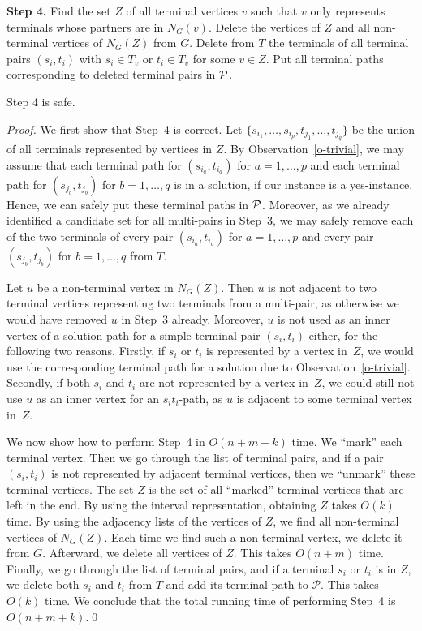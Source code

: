 \documentclass{llncs}
\newcommand{\mc}{\mathcal}
\begin{document}
\medskip
\noindent
{\bf Step 4.}
Find the set $Z$ of all terminal vertices $v$ such that $v$ only represents terminals  whose partners are in $N_G(v)$.
Delete the vertices of $Z$ and all non-terminal vertices of $N_G(Z)$ from $G$. Delete from $T$ the terminals of all terminal pairs $(s_i,t_i)$ with $s_i\in T_v$ or $t_i\in T_v$ for some $v\in Z$. Put all terminal paths corresponding to deleted terminal pairs in ${\cal P}$.

\begin{lemma}\label{l-4}
Step 4 is safe.
\end{lemma}

\begin{proof}
We first show that Step~4 is correct. Let $\{s_{i_1},\ldots,s_{i_p},t_{j_1},\ldots,t_{j_q}\}$ be the union of all terminals represented by
vertices in  $Z$. 
By Observation~\ref{o-trivial}, we may assume that each terminal path for $(s_{i_a},t_{i_a})$ for $a=1,\ldots,p$ and each terminal path for 
$(s_{j_b},t_{j_b})$ for $b = 1,\ldots,q$ is 
in a solution, if our instance is a yes-instance. Hence, we can safely put these terminal paths in ${\cal P}$. Moreover, as we already identified a candidate set for all multi-pairs  in Step~3, we may safely remove each of the two terminals of every pair $(s_{i_a},t_{i_a})$ for $a=1,\ldots,p$ and every pair $(s_{j_b},t_{j_b})$ for $b=1,\ldots,q$
from $T$.

Let $u$ be a non-terminal vertex in $N_G(Z)$. 
Then $u$ is not adjacent to two terminal vertices representing two terminals from a multi-pair, as otherwise we would
have removed $u$ in Step~3 already. Moreover, $u$ is not used as an inner vertex of a solution path for a simple terminal pair $(s_i,t_i)$ either, for the following two reasons.
Firstly, if $s_i$ or $t_i$ is represented by a vertex in~$Z$, we would use the corresponding terminal path for a solution due to
Observation~\ref{o-trivial}. Secondly, if both $s_i$ and $t_i$ are not represented by a vertex in~$Z$,  we could still not use
$u$ as an inner vertex for an $s_it_i$-path, as $u$ is adjacent to some terminal vertex in~$Z$.

We now show how to perform Step~4 in $O(n+m+k)$ time.
We ``mark'' each terminal vertex. Then we go through the list of terminal pairs, and if a pair $(s_{i},t_{i})$ is not represented by adjacent terminal vertices, then we ``unmark''  these terminal vertices. 
The set $Z$ is the set of  all ``marked''  terminal vertices that are left in the end. 
By using the interval representation, obtaining $Z$ takes $O(k)$ time.
By using the adjacency lists of the vertices of $Z$, we find all non-terminal vertices of $N_G(Z)$. Each time we find such a non-terminal vertex, we delete it from $G$. Afterward, we delete all vertices of $Z$.
This takes $O(n+m)$ time.
Finally, we go through the list of terminal pairs, and if a terminal $s_i$ or $t_i$ is in $Z$, we delete both $s_i$ and $t_i$ from $T$ and add its terminal path to $\mc{P}$.
This takes $O(k)$ time. We conclude that
the total running time of performing Step~4 is~$O(n+m+k)$.\qed
\end{proof}
\end{document}
